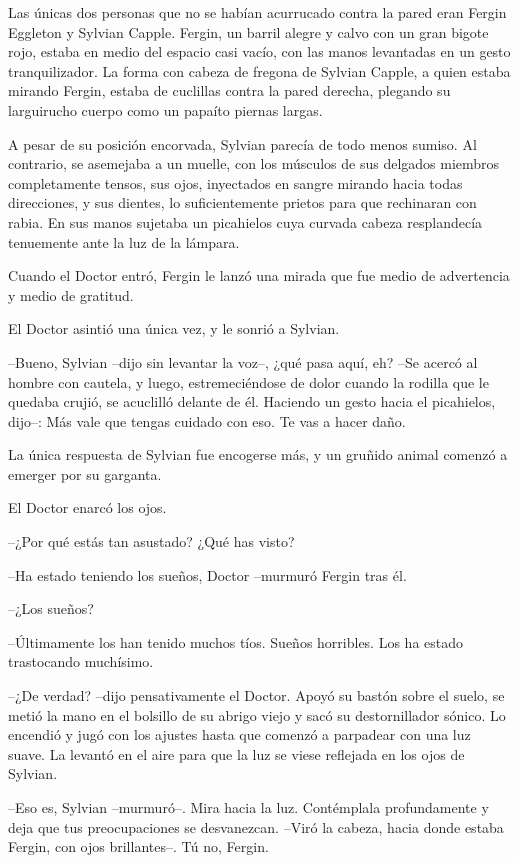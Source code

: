Las únicas dos personas que no se habían acurrucado contra la pared eran Fergin Eggleton y Sylvian Capple. Fergin, un barril alegre y calvo con un gran bigote rojo, estaba en medio del espacio casi vacío, con las manos levantadas en un gesto tranquilizador. La forma con cabeza de fregona de Sylvian Capple, a quien estaba mirando Fergin, estaba de cuclillas contra la pared derecha, plegando su larguirucho cuerpo como un papaíto piernas largas.

A pesar de su posición encorvada, Sylvian parecía de todo menos sumiso. Al contrario, se asemejaba a un muelle, con los músculos de sus delgados miembros completamente tensos, sus ojos, inyectados en sangre mirando hacia todas direcciones, y sus dientes, lo suficientemente prietos para que rechinaran con rabia. En sus manos sujetaba un picahielos cuya curvada cabeza resplandecía tenuemente ante la luz de la lámpara.

Cuando el Doctor entró, Fergin le lanzó una mirada que fue medio de advertencia y medio de gratitud.

El Doctor asintió una única vez, y le sonrió a Sylvian.

--Bueno, Sylvian --dijo sin levantar la voz--, ¿qué pasa aquí, eh? --Se acercó al hombre con cautela, y luego, estremeciéndose de dolor cuando la rodilla que le quedaba crujió, se acuclilló delante de él. Haciendo un gesto hacia el picahielos, dijo--: Más vale que tengas cuidado con eso. Te vas a hacer daño.

La única respuesta de Sylvian fue encogerse más, y un gruñido animal comenzó a emerger por su garganta.

El Doctor enarcó los ojos.

--¿Por qué estás tan asustado? ¿Qué has visto?

--Ha estado teniendo los sueños, Doctor --murmuró Fergin tras él.

--¿Los sueños?

--Últimamente los han tenido muchos tíos. Sueños horribles. Los ha estado trastocando muchísimo.

--¿De verdad? --dijo pensativamente el Doctor. Apoyó su bastón sobre el suelo, se metió la mano en el bolsillo de su abrigo viejo y sacó su destornillador sónico. Lo encendió y jugó con los ajustes hasta que comenzó a parpadear con una luz suave. La levantó en el aire para que la luz se viese reflejada en los ojos de Sylvian.

--Eso es, Sylvian --murmuró--. Mira hacia la luz. Contémplala profundamente y deja que tus preocupaciones se desvanezcan. --Viró la cabeza, hacia donde estaba Fergin, con ojos brillantes--. Tú no, Fergin.

